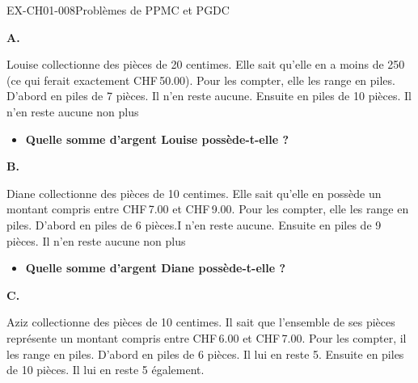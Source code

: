 \documentclass[12pt, a4paper]{article}
\begin{document}
\begin{exercice}{EX-CH01-008}{Problèmes de PPMC et PGDC}

\bigskip\textbf{A.}

\medskip
Louise collectionne des pièces de 20 centimes. Elle sait qu'elle en a moins de 250 (ce qui ferait exactement CHF\,50.00). Pour les compter, elle les range en piles. D'abord en piles de 7 pièces. Il n'en reste aucune. Ensuite en piles de 10 pièces. Il n'en reste aucune non plus

\begin{itemize}[label=$\blacktriangleright$]
\item \textbf{Quelle somme d'argent Louise possède-t-elle ?}
\end{itemize}


\bigskip\textbf{B.}

\medskip
Diane collectionne des pièces de 10 centimes. Elle sait qu'elle en possède un montant compris entre CHF\,7.00 et CHF\,9.00. Pour les compter, elle les range en piles. D'abord en piles de 6 pièces.I n'en reste aucune. Ensuite en piles de 9 pièces. Il n'en reste aucune non plus

\begin{itemize}[label=$\blacktriangleright$]
\item \textbf{Quelle somme d'argent Diane possède-t-elle ?}
\end{itemize}

\bigskip\textbf{C.}

\medskip
Aziz collectionne des pièces de 10 centimes. Il sait que l'ensemble de ses pièces représente un montant compris entre CHF\,6.00 et CHF\,7.00. Pour les compter, il les range en piles. D'abord en piles de 6 pièces. Il lui en reste 5. Ensuite en piles de 10 pièces. Il lui en reste 5 également.


\end{exercice}
\end{document}
